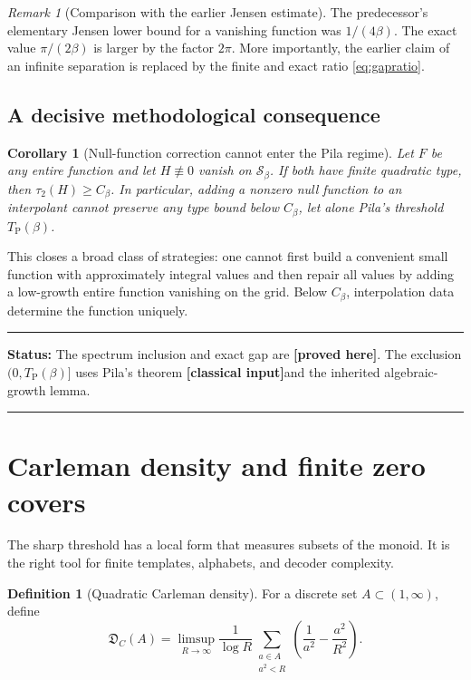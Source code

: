 \documentclass[11pt,oneside]{article}
\newtheorem{corollary}[theorem]{Corollary}
\theoremstyle{definition}
\newtheorem{definition}[theorem]{Definition}
\theoremstyle{remark}
\newtheorem{remark}[theorem]{Remark}
\newcommand{\Sbeta}{\mathcal S_\beta}
\newcommand{\DC}{\mathfrak D_{\!C}}
\newcommand{\Cbeta}{C_\beta}
\newcommand{\TP}{T_{\mathrm P}(\beta)}
\newcommand{\statusproved}{\textcolor{provedgreen}{\textbf{[proved here]}}}
\newcommand{\statusclassical}{\textcolor{classicalblue}{\textbf{[classical input]}}}
\newenvironment{statusbox}[1]
{\begin{center}\begin{minipage}{0.94\textwidth}\raggedright\hrule\vspace{0.45em}\textbf{Status:} #1\par\vspace{0.35em}}
{\vspace{0.35em}\hrule\end{minipage}\end{center}}
\begin{document}
\begin{remark}[Comparison with the earlier Jensen estimate]
The predecessor's elementary Jensen lower bound for a vanishing function was
$1/(4\beta)$.  The exact value $\pi/(2\beta)$ is larger by the factor $2\pi$.  More
importantly, the earlier claim of an infinite separation is replaced by the finite and exact
ratio \eqref{eq:gapratio}.
\end{remark}

\subsection{A decisive methodological consequence}

\begin{corollary}[Null-function correction cannot enter the Pila regime]
\label{cor:nullcorrection}
Let $F$ be any entire function and let $H\not\equiv0$ vanish on $\Sbeta$.  If both have
finite quadratic type, then $\tau_2(H)\ge\Cbeta$.  In particular, adding a nonzero null
function to an interpolant cannot preserve any type bound below $\Cbeta$, let alone Pila's
threshold $\TP$.
\end{corollary}

This closes a broad class of strategies: one cannot first build a convenient small function
with approximately integral values and then repair all values by adding a low-growth entire
function vanishing on the grid.  Below $\Cbeta$, interpolation data determine the function
uniquely.

\begin{statusbox}{The spectrum inclusion and exact gap are \statusproved.  The exclusion
$(0,\TP]$ uses Pila's theorem \statusclassical and the inherited algebraic-growth lemma.}
\end{statusbox}

\section{Carleman density and finite zero covers}
\label{sec:cover}

The sharp threshold has a local form that measures subsets of the monoid.  It is the right
tool for finite templates, alphabets, and decoder complexity.

\begin{definition}[Quadratic Carleman density]
For a discrete set $A\subset(1,\infty)$, define
\begin{equation}
 \DC(A)=\limsup_{R\to\infty}\frac1{\log R}
 \sum_{\substack{a\in A\\a^2<R}}
 \left(\frac1{a^2}-\frac{a^2}{R^2}\right).
 \label{eq:DC}
\end{equation}
\end{definition}
\end{document}
